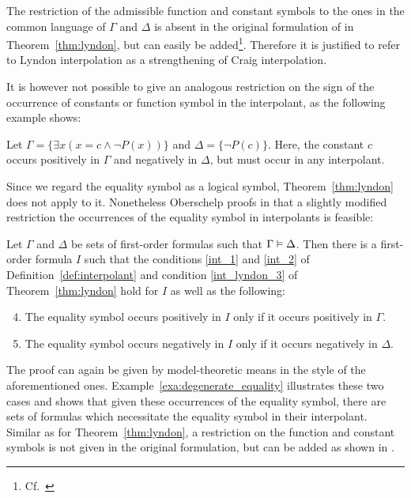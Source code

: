 The restriction of the admissible function and constant symbols to the ones in the common language of $\Gamma$ and $\Delta$ is absent in the original formulation of in Theorem~\ref{thm:lyndon}, but can easily be added\footnote{Cf.\ \cite{motohashi84}}.
Therefore it is justified to refer to Lyndon interpolation as a strengthening of Craig interpolation.

It is however not possible to give an analogous restriction on the sign of the occurrence of constants or function symbol in the interpolant, as the following example shows: 

\begin{exa}
	Let $\Gamma = \{ \exists x ( x = c \land \lnot P(x)) \}$ and $\Delta = \{ \lnot P(c) \}$.
	Here, the constant $c$ occurs positively in $\Gamma$ and negatively in $\Delta$, but must occur in any interpolant.
\end{exa}

Since we regard the equality symbol as a logical symbol, Theorem~\ref{thm:lyndon} does not apply to it.
Nonetheless
Oberschelp proofs in \cite{oberschelp68} that a slightly modified restriction the occurrences of the equality symbol in interpolants is feasible:

\begin{thm}[Oberschelp]
	\label{thm:oberschelp}
	Let $\Gamma$ and $\Delta$ be sets of first-order formulas such that $\Gamma \entails\nolinebreak \Delta$. 
	Then there is a first-order formula $I$ such that the conditions \ref{int_1} and \ref{int_2} of Definition~\ref{def:interpolant} and condition \ref{int_lyndon_3} of Theorem~\ref{thm:lyndon} hold for $I$ as well as the following:

	\begin{enumerate}%
		\setcounter{enumi}{3}
		\item 
			The equality symbol occurs positively in $I$ only if it occurs positively in $\Gamma$.
		\item
			The equality symbol occurs negatively in $I$ only if it occurs negatively in $\Delta$.
	\end{enumerate}
\end{thm}

The proof can again be given by model-theoretic means in the style of the aforementioned ones.
Example~\ref{exa:degenerate_equality} illustrates these two cases and shows that given these occurrences of the equality symbol, there are sets of formulas which necessitate the equality symbol in their interpolant.
Similar as for Theorem~\ref{thm:lyndon}, a restriction on the function and constant symbols is not given in the original formulation, but can be added as shown in \cite{fujiwara78}.

